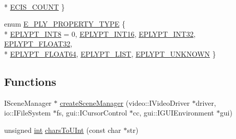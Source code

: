 \begin{DoxyCompactItemize}
\\*
\hyperlink{namespaceirr_1_1scene_a64e4fa8a05f39e08f3e68bbf5869d6dfa6b5c094dc20024963061ddb3af4f7dd2}{E\-C\-I\-S\-\_\-\-C\-O\-U\-N\-T}
 \}
\item 
enum \hyperlink{namespaceirr_1_1scene_a0494d0b9f666df59c145488f5d588f1a}{E\-\_\-\-P\-L\-Y\-\_\-\-P\-R\-O\-P\-E\-R\-T\-Y\-\_\-\-T\-Y\-P\-E} \{ \\*
\hyperlink{namespaceirr_1_1scene_a0494d0b9f666df59c145488f5d588f1aa0c2dfb359f7b0ea8436b041ee3cc5aba}{E\-P\-L\-Y\-P\-T\-\_\-\-I\-N\-T8} = 0, 
\hyperlink{namespaceirr_1_1scene_a0494d0b9f666df59c145488f5d588f1aa5c0b6cb5a468b8f10663b82868c22b04}{E\-P\-L\-Y\-P\-T\-\_\-\-I\-N\-T16}, 
\hyperlink{namespaceirr_1_1scene_a0494d0b9f666df59c145488f5d588f1aa6b056adaae8d267a1d33a1294d51b469}{E\-P\-L\-Y\-P\-T\-\_\-\-I\-N\-T32}, 
\hyperlink{namespaceirr_1_1scene_a0494d0b9f666df59c145488f5d588f1aa5bfdca5a0929ff7bcdbdca61d3937156}{E\-P\-L\-Y\-P\-T\-\_\-\-F\-L\-O\-A\-T32}, 
\\*
\hyperlink{namespaceirr_1_1scene_a0494d0b9f666df59c145488f5d588f1aa9b6b4415b2a674a70fe9a65efb8a2a3f}{E\-P\-L\-Y\-P\-T\-\_\-\-F\-L\-O\-A\-T64}, 
\hyperlink{namespaceirr_1_1scene_a0494d0b9f666df59c145488f5d588f1aaeee0b596e1e2616051f1b0490ae68b87}{E\-P\-L\-Y\-P\-T\-\_\-\-L\-I\-S\-T}, 
\hyperlink{namespaceirr_1_1scene_a0494d0b9f666df59c145488f5d588f1aa16d4cc5e6613ba9332018d300990303b}{E\-P\-L\-Y\-P\-T\-\_\-\-U\-N\-K\-N\-O\-W\-N}
 \}
\end{DoxyCompactItemize}
\subsection*{Functions}
\begin{DoxyCompactItemize}
\item 
I\-Scene\-Manager $\ast$ \hyperlink{namespaceirr_1_1scene_a58689a06e4e31bb0129026d0d5d5eb71}{create\-Scene\-Manager} (video\-::\-I\-Video\-Driver $\ast$driver, io\-::\-I\-File\-System $\ast$fs, gui\-::\-I\-Cursor\-Control $\ast$cc, gui\-::\-I\-G\-U\-I\-Environment $\ast$gui)
\item 
unsigned \hyperlink{wglext_8h_a500a82aecba06f4550f6849b8099ca21}{int} \hyperlink{namespaceirr_1_1scene_ad3aadac4b26647da93b5b3c0039ce380}{chars\-To\-U\-Int} (const char $\ast$str)
\end{DoxyCompactItemize}
